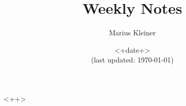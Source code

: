 \documentclass[a4paper]{article}
\title{Weekly Notes}
\author{Marius Kleiner}
\date{<+date+>\\\small(last updated: \today)}
\theoremstyle{definition}
\begin{document}
\maketitle

<++>

%
\end{document}
